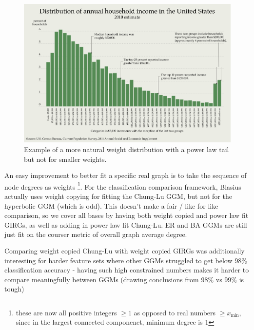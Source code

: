 \begin{figure}
    \centering
    \includegraphics[width=\textwidth]{./figures/Distribution_of_Annual_Household_Income_in_the_United_States_2010.png}
    \caption{Example of a more natural weight distribution with a power law tail but not for smaller weights.}
    \label{fig:natural_weight_distribution}
\end{figure}


An easy improvement to better fit a specific real graph is to take the sequence of node degrees as weights
\footnote{these are now all positive integers $\geq 1$ as opposed to real numbers $\geq x_{\min}$, since in the largest connected componenet, minimum degree is 1}.
For the classification comparison framework, Blasius actually uses weight copying for fitting the Chung-Lu GGM, but not for the hyperbolic GGM (which is odd). This doesn't make a fair / like for like comparison, so we cover all bases by having both weight copied and power law fit GIRGs, as well as adding in power law fit Chung-Lu. ER and BA GGMs are still just fit on the courser metric of overall graph average degree.

Comparing weight copied Chung-Lu with weight copied GIRGs was additionally interesting for harder feature sets where other GGMs struggled to get below 98\% classification accuracy - having such high constrained numbers makes it harder to compare meaningfully between GGMs (drawing conclusions from 98\% vs 99\% is tough)

